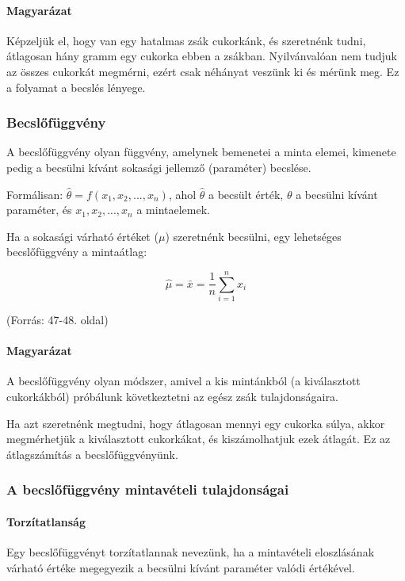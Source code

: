 \documentclass[a4paper,12pt]{article}
\begin{document}
    \paragraph{Magyarázat}
    Képzeljük el, hogy van egy hatalmas zsák cukorkánk, és szeretnénk tudni, átlagosan hány gramm egy cukorka ebben a zsákban. Nyilvánvalóan nem tudjuk az összes cukorkát megmérni, ezért csak néhányat veszünk ki és mérünk meg. Ez a folyamat a becslés lényege.

    \subsubsection{Becslőfüggvény}

    A becslőfüggvény olyan függvény, amelynek bemenetei a minta elemei, kimenete pedig a becsülni kívánt sokasági jellemző (paraméter) becslése.

    Formálisan: $\hat{\theta} = f(x_1, x_2, ..., x_n)$, ahol $\hat{\theta}$ a becsült érték, $\theta$ a becsülni kívánt paraméter, és $x_1, x_2, ..., x_n$ a mintaelemek.

    Ha a sokasági várható értéket ($\mu$) szeretnénk becsülni, egy lehetséges becslőfüggvény a mintaátlag:

    \[ \hat{\mu} = \bar{x} = \frac{1}{n}\sum_{i=1}^n x_i \]

    (Forrás: 47-48. oldal)

    \paragraph{Magyarázat}
    A becslőfüggvény olyan módszer, amivel a kis mintánkból (a kiválasztott cukorkákból) próbálunk következtetni az egész zsák tulajdonságaira.

    Ha azt szeretnénk megtudni, hogy átlagosan mennyi egy cukorka súlya, akkor megmérhetjük a kiválasztott cukorkákat, és kiszámolhatjuk ezek átlagát. Ez az átlagszámítás a becslőfüggvényünk.

    \subsubsection{A becslőfüggvény mintavételi tulajdonságai}

    \paragraph{Torzítatlanság}

    Egy becslőfüggvényt torzítatlannak nevezünk, ha a mintavételi eloszlásának várható értéke megegyezik a becsülni kívánt paraméter valódi értékével.
\end{document}
